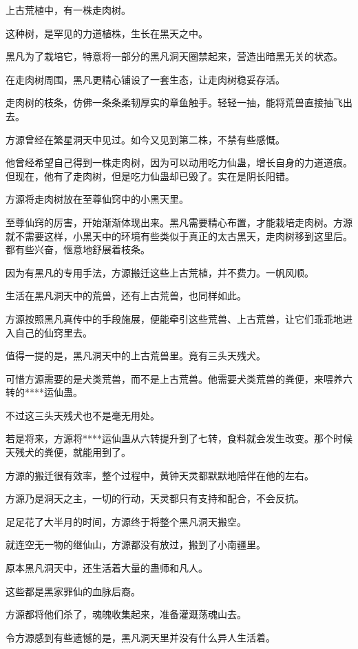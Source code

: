 \begin{this_body}
上古荒植中，有一株走肉树。

这种树，是罕见的力道植株，生长在黑天之中。

黑凡为了栽培它，特意将一部分的黑凡洞天圈禁起来，营造出暗黑无关的状态。

在走肉树周围，黑凡更精心铺设了一套生态，让走肉树稳妥存活。

走肉树的枝条，仿佛一条条柔韧厚实的章鱼触手。轻轻一抽，能将荒兽直接抽飞出去。

方源曾经在繁星洞天中见过。如今又见到第二株，不禁有些感慨。

他曾经希望自己得到一株走肉树，因为可以动用吃力仙蛊，增长自身的力道道痕。但现在，他有了走肉树，但是吃力仙蛊却已毁了。实在是阴长阳错。

方源将走肉树放在至尊仙窍中的小黑天里。

至尊仙窍的厉害，开始渐渐体现出来。黑凡需要精心布置，才能栽培走肉树。方源就不需要这样，小黑天中的环境有些类似于真正的太古黑天，走肉树移到这里后。都有些兴奋，惬意地舒展着枝条。

因为有黑凡的专用手法，方源搬迁这些上古荒植，并不费力。一帆风顺。

生活在黑凡洞天中的荒兽，还有上古荒兽，也同样如此。

方源按照黑凡真传中的手段施展，便能牵引这些荒兽、上古荒兽，让它们乖乖地进入自己的仙窍里去。

值得一提的是，黑凡洞天中的上古荒兽里。竟有三头天残犬。

可惜方源需要的是犬类荒兽，而不是上古荒兽。他需要犬类荒兽的粪便，来喂养六转的****运仙蛊。

不过这三头天残犬也不是毫无用处。

若是将来，方源将****运仙蛊从六转提升到了七转，食料就会发生改变。那个时候天残犬的粪便，就能用到了。

方源的搬迁很有效率，整个过程中，黄钟天灵都默默地陪伴在他的左右。

方源乃是洞天之主，一切的行动，天灵都只有支持和配合，不会反抗。

足足花了大半月的时间，方源终于将整个黑凡洞天搬空。

就连空无一物的继仙山，方源都没有放过，搬到了小南疆里。

原本黑凡洞天中，还生活着大量的蛊师和凡人。

这些都是黑家罪仙的血脉后裔。

方源都将他们杀了，魂魄收集起来，准备灌溉荡魂山去。

令方源感到有些遗憾的是，黑凡洞天里并没有什么异人生活着。


\end{this_body}
